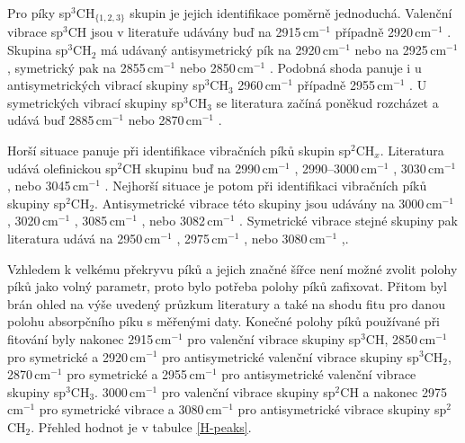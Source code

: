 Pro píky sp$^3$CH$_{\{1,2,3\}}$ skupin je jejich identifikace poměrně jednoduchá. Valenční vibrace sp$^3$CH jsou v literatuře udávány buď na 2915\,cm$^{-1}$ \cite{Zajickova2011, Dischler1983} případně 2920\,cm$^{-1}$ \cite{Robertson2002, Ristein1998}. Skupina sp$^3$CH$_2$ má udávaný antisymetrický pík na 2920\,cm$^{-1}$ \cite{Dischler1983, Robertson2002, Ristein1998} nebo na 2925\,cm$^{-1}$ \cite{Zajickova2011}, symetrický pak na 2855\,cm$^{-1}$ \cite{Robertson2002, Ristein1998, Zajickova2011} nebo 2850\,cm$^{-1}$ \cite{Dischler1983}. Podobná shoda panuje i u antisymetrických vibrací skupiny sp$^3$CH$_3$ 2960\,cm$^{-1}$ \cite{Zajickova2011, Dischler1983} případně 2955\,cm$^{-1}$ \cite{Robertson2002, Ristein1998}. U symetrických vibrací skupiny sp$^3$CH$_3$ se literatura začíná poněkud rozcházet a udává buď 2885\,cm$^{-1}$ \cite{Robertson2002, Ristein1998} nebo 2870\,cm$^{-1}$ \cite{Zajickova2011, Dischler1983}. 

Horší situace panuje při identifikace vibračních píků skupin sp$^2$CH$_x$. Literatura udává olefinickou sp$^2$CH skupinu buď na 2990\,cm$^{-1}$ \cite{Ristein1998}, 2990--3000\,cm$^{-1}$ \cite{Robertson2002}, 3030\,cm$^{-1}$ \cite{Zajickova2011}, nebo 3045\,cm$^{-1}$ \cite{Dischler1983}. Nejhorší situace je potom při identifikaci vibračních píků skupiny sp$^2$CH$_2$. Antisymetrické vibrace této skupiny jsou udávány na 3000\,cm$^{-1}$ \cite{Zajickova2011}, 3020\,cm$^{-1}$ \cite{Dischler1983}, 3085\,cm$^{-1}$ \cite{Robertson2002}, nebo 3082\,cm$^{-1}$ \cite{Ristein1998}. Symetrické vibrace stejné skupiny pak literatura udává na 2950\,cm$^{-1}$ \cite{Dischler1983}, 2975\,cm$^{-1}$ \cite{Robertson2002, Ristein1998}, nebo 3080\,cm$^{-1}$ \cite{Zajickova2011},.

Vzhledem k velkému překryvu píků a jejich značné šířce není možné zvolit polohy píků jako volný parametr, proto bylo potřeba polohy píků zafixovat. Přitom byl brán ohled na výše uvedený průzkum literatury a také na shodu fitu pro danou polohu absorpčního píku s měřenými daty. 
Konečné polohy píků používané při fitování byly nakonec 2915\,cm$^{-1}$ pro valenční vibrace skupiny sp$^3$CH, 2850\,cm$^{-1}$ pro symetrické a 2920\,cm$^{-1}$ pro antisymetrické valenční vibrace skupiny sp$^3$CH$_2$, 2870\,cm$^{-1}$ pro symetrické a 2955\,cm$^{-1}$ pro antisymetrické valenční vibrace skupiny sp$^3$CH$_3$. 3000\,cm$^{-1}$ pro valenční vibrace skupiny sp$^2$CH a nakonec 2975\,cm$^{-1}$ pro symetrické vibrace a 3080\,cm$^{-1}$ pro antisymetrické vibrace skupiny sp$^2$CH$_2$. Přehled hodnot je v tabulce \ref{H-peaks}.

